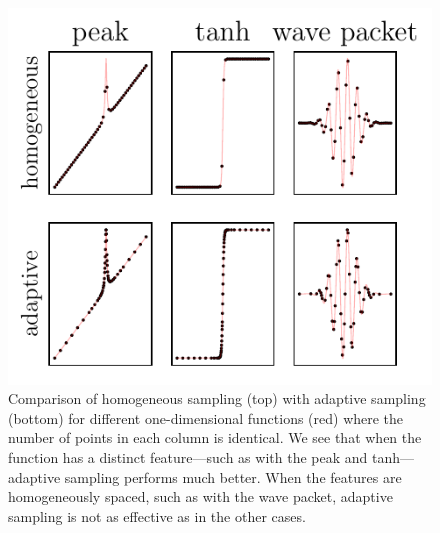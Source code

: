 \documentclass[english, twocolumn, 10pt, aps, superscriptaddress, floatfix, prb, citeautoscript]{revtex4-1}
\begin{document}
\begin{figure}
\hypertarget{fig:Learner1D}{%
\centering
\includegraphics{figures/Learner1D.pdf}
\caption{Comparison of homogeneous sampling (top) with adaptive sampling (bottom) for different one-dimensional functions (red) where the number of points in each column is identical.
We see that when the function has a distinct feature---such as with the peak and tanh---adaptive sampling performs much better.
When the features are homogeneously spaced, such as with the wave packet, adaptive sampling is not as effective as in the other cases.}\label{fig:Learner1D}
}
\end{figure}
\end{document}
